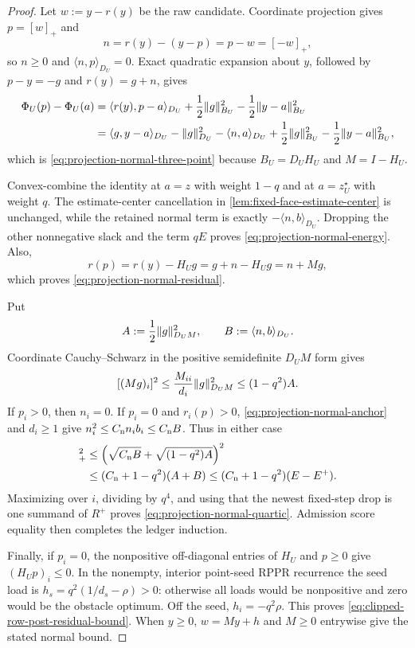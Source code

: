 \begin{proof}
Let $w:=y-r(y)$ be the raw candidate.  Coordinate projection gives
$p=[w]_+$ and
\[
 n=r(y)-(y-p)=p-w=[-w]_+,
\]
so $n\geq0$ and $\langle n,p\rangle_{D_U}=0$.  Exact quadratic expansion
about $y$, followed by $p-y=-g$ and
$r(y)=g+n$, gives
\begin{align*}
 \Phi_U(p)-\Phi_U(a)
 &=\langle r(y),p-a\rangle_{D_U}
   +\frac12\lVert g\rVert_{B_U}^2
   -\frac12\lVert y-a\rVert_{B_U}^2\\
 &=\langle g,y-a\rangle_{D_U}
   -\lVert g\rVert_{D_U}^2
   -\langle n,a\rangle_{D_U}
   +\frac12\lVert g\rVert_{B_U}^2
   -\frac12\lVert y-a\rVert_{B_U}^2,
\end{align*}
which is \cref{eq:projection-normal-three-point} because
$B_U=D_UH_U$ and $M=I-H_U$.

Convex-combine the identity at $a=z$ with weight $1-q$ and at
$a=z_U^\star$ with weight $q$.  The estimate-center cancellation in
\cref{lem:fixed-face-estimate-center} is unchanged, while the retained normal
term is exactly $-\langle n,b\rangle_{D_U}$.  Dropping the other nonnegative
slack and the term $qE$ proves
\cref{eq:projection-normal-energy}.  Also,
\[
 r(p)=r(y)-H_Ug=g+n-H_Ug=n+Mg,
\]
which proves \cref{eq:projection-normal-residual}.

Put
\[
 A:=\frac12\lVert g\rVert_{D_UM}^2,\qquad
 B:=\langle n,b\rangle_{D_U}.
\]
Coordinate Cauchy--Schwarz in the positive semidefinite $D_UM$ form gives
\[
 [(Mg)_i]^2
 \leq\frac{M_{ii}}{d_i}\lVert g\rVert_{D_UM}^2
 \leq(1-q^2)A.
\]
If $p_i>0$, then $n_i=0$.  If $p_i=0$ and $r_i(p)>0$,
\cref{eq:projection-normal-anchor} and $d_i\geq1$ give
$n_i^2\leq C_{\rm n}n_ib_i\leq C_{\rm n}B$.  Thus in either case
\begin{align*}
 [r_i(p)]_+^2
 &\leq
 \left(\sqrt{C_{\rm n}B}
       +\sqrt{(1-q^2)A}\right)^2\\
 &\leq(C_{\rm n}+1-q^2)(A+B)
 \leq(C_{\rm n}+1-q^2)(E-E^+).
\end{align*}
Maximizing over $i$, dividing by $q^4$, and using that the newest fixed-step
drop is one summand of $R^+$ proves
\cref{eq:projection-normal-quartic}.  Admission score equality then completes
the ledger induction.

Finally, if $p_i=0$, the nonpositive off-diagonal entries of $H_U$ and
$p\geq0$ give $(H_Up)_i\leq0$.  In the nonempty, interior point-seed RPPR
recurrence the seed load is $h_s=q^2(1/d_s-\rho)>0$: otherwise all loads
would be nonpositive and zero would be the obstacle optimum.  Off the seed,
$h_i=-q^2\rho$.  This proves
\cref{eq:clipped-row-post-residual-bound}.  When $y\geq0$,
$w=My+h$ and $M\geq0$ entrywise give the stated normal bound.
\end{proof}

